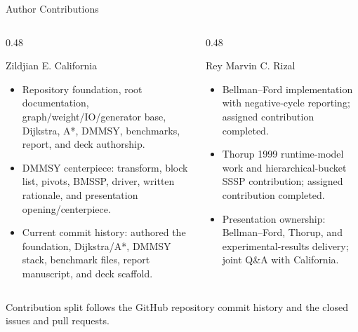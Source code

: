 \documentclass[aspectratio=169]{beamer}
\begin{document}
\begin{frame}{Author Contributions}
  \footnotesize
  \begin{columns}[T]
    \begin{column}{0.48\textwidth}
      \begin{block}{Zildjian E. California}
        \begin{itemize}
          \item Repository foundation, root documentation, graph/weight/IO/generator base, Dijkstra, A*, DMMSY, benchmarks,\\report, and deck authorship.
          \item DMMSY centerpiece: transform, block list, pivots, BMSSP, driver, written rationale, and presentation opening/centerpiece.
          \item Current commit history: authored the foundation, Dijkstra/A*, DMMSY stack, benchmark files, report manuscript, and deck scaffold.
        \end{itemize}
      \end{block}
    \end{column}
    \begin{column}{0.48\textwidth}
      \begin{block}{Rey Marvin C. Rizal}
        \begin{itemize}
          \item Bellman--Ford implementation with negative-cycle reporting; assigned contribution completed.
          \item Thorup 1999 runtime-model work and hierarchical-bucket SSSP contribution; assigned contribution completed.
          \item Presentation ownership: Bellman--Ford, Thorup, and experimental-results delivery; joint Q\&A with California.
        \end{itemize}
      \end{block}
    \end{column}
  \end{columns}

  \vskip 1pt
  \begin{center}
    \scriptsize Contribution split follows the GitHub repository commit history and the closed issues and pull requests.
  \end{center}
\end{frame}
\end{document}
